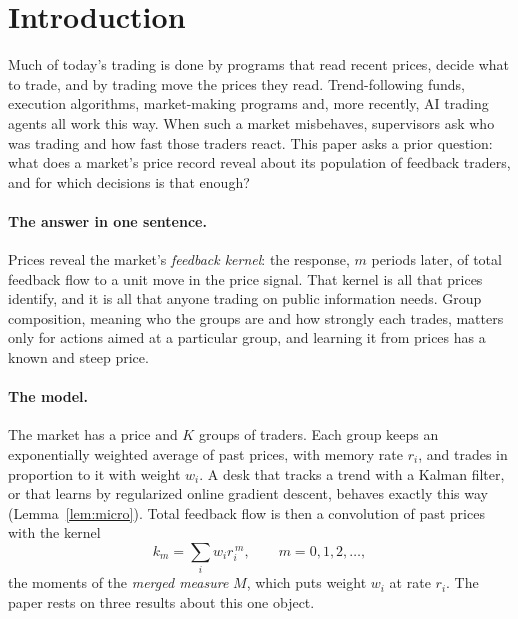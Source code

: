 \section{Introduction}\label{sec:intro}

Much of today's trading is done by programs that read recent prices, decide what to trade, and by trading move the prices they read. Trend-following funds, execution algorithms, market-making programs and, more recently, AI trading agents all work this way. When such a market misbehaves, supervisors ask who was trading and how fast those traders react. This paper asks a prior question: what does a market's price record reveal about its population of feedback traders, and for which decisions is that enough?

\paragraph{The answer in one sentence.} Prices reveal the market's \emph{feedback kernel}: the response, $m$ periods later, of total feedback flow to a unit move in the price signal. That kernel is all that prices identify, and it is all that anyone trading on public information needs. Group composition, meaning who the groups are and how strongly each trades, matters only for actions aimed at a particular group, and learning it from prices has a known and steep price.

\paragraph{The model.} The market has a price and $K$ groups of traders. Each group keeps an exponentially weighted average of past prices, with memory rate $r_i$, and trades in proportion to it with weight $w_i$. A desk that tracks a trend with a Kalman filter, or that learns by regularized online gradient descent, behaves exactly this way (Lemma~\ref{lem:micro}). Total feedback flow is then a convolution of past prices with the kernel
\[
 k_m=\sum_i w_i r_i^{\,m},\qquad m=0,1,2,\ldots,
\]
the moments of the \emph{merged measure} $M$, which puts weight $w_i$ at rate $r_i$. The paper rests on three results about this one object.

